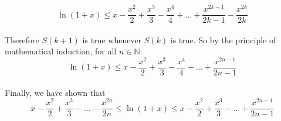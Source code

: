 \documentclass[12pt]{amsart}
\begin{document}
\begin{enumerate}
		$$\ln(1+x) \le x-\frac{x^2}{2}+\frac{x^3}{3}-\frac{x^4}{4}+...+\frac{x^{2k-1}}{2k-1}-\frac{x^{2k}}{2k}$$
		\\
		Therefore $S(k+1)$ is true whenever $S(k)$ is true. So by the principle of mathematical induction, 			for all $n \in \mathbb{N}:$ \\
		$$\ln(1+x) \le x-\frac{x^2}{2}+\frac{x^3}{3}-\frac{x^4}{4}+...+\frac{x^{2n-1}}{2n-1}$$ \\
		Finally, we have shown that
		$$x-\frac{x^2}{2}+\frac{x^3}{3}-...-\frac{x^{2n}}{2n} \le \ln(1+x) \le x-\frac{x^2}{2}+\frac{x^3}{3}-...+
		\frac{x^{2n-1}}{2n-1}$$
		
\end{enumerate}
	
\end{document}

